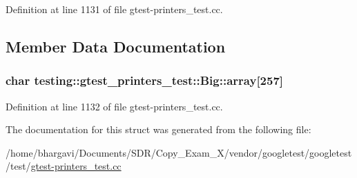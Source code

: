 Definition at line 1131 of file gtest-\/printers\+\_\+test.\+cc.



\subsection{Member Data Documentation}
\subsubsection[{\texorpdfstring{array}{array}}]{\setlength{\rightskip}{0pt plus 5cm}char testing\+::gtest\+\_\+printers\+\_\+test\+::\+Big\+::array\mbox{[}257\mbox{]}}\hypertarget{structtesting_1_1gtest__printers__test_1_1_big_a863911a8ec5c3bbe79c44d399f1de61f}{}\label{structtesting_1_1gtest__printers__test_1_1_big_a863911a8ec5c3bbe79c44d399f1de61f}


Definition at line 1132 of file gtest-\/printers\+\_\+test.\+cc.



The documentation for this struct was generated from the following file\+:\begin{DoxyCompactItemize}
\item 
/home/bhargavi/\+Documents/\+S\+D\+R/\+Copy\+\_\+\+Exam\+\_\+X/vendor/googletest/googletest/test/\hyperlink{gtest-printers__test_8cc}{gtest-\/printers\+\_\+test.\+cc}\end{DoxyCompactItemize}
